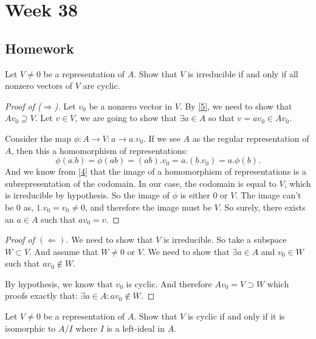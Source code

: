 \section{Week 38}



\subsection*{Homework}
\begin{thm}
Let \(V\neq 0\) be a representation of \(A\). Show that \(V\) is irreducible if and only if all nonzero vectors of \(V\) are cyclic.
\end{thm}

\begin{proof} [Proof of (\(\Longrightarrow\))]  Let \(v_{0}\) be a nonzero vector in \(V\). By \ref{5}, we need to show that \(Av_{0}\supseteq V\). Let \(v\in V\), we are going to show that \(\exists a\in A\) so that \(v=av_{0}\in Av_{0}\).

Consider the map \(\phi  : A \rightarrow V : a \rightarrow a.v_{0}\). If we see \(A\) as the regular representation of \(A\), then this a homomorphism of representations:
\[\phi (a.b)=\phi (ab)=(ab).v_{0}= a.(b.v_{0})=a.\phi (b).\]
And we know from \ref{4} that the image of a homomorphism of representations is a subrepresentation of the codomain. In our case, the codomain is equal to \(V\), which is irreducible by hypothesis. So the image of \(\phi \) is either \(0\) or \(V\). The image can't be $0$ as, \(1.v_{0}=v_{0}\neq 0\), and therefore the image must be \(V\). So surely, there exists an \(a\in A\) such that \(av_{0}=v\). \end{proof}

\begin{proof}[Proof of \((\Longleftarrow )\)] We need to show that \(V\) is irreducible. So take a subspace \(W\subset V\). And assume that \(W\neq 0\) or \(V\). We need to show that \(\exists a\in A\) and \(v_{0}\in W\) such that \(av_{0}\not\in W\).

By hypothesis, we know that \(v_{0}\) is cyclic. And therefore \(Av_{0}=V\supset W\) which proofs exactly that: \(\exists a\in A : av_{0}\not\in W.\)
\end{proof}

\begin{thm}
Let \(V\neq 0\) be a representation of \(A\). Show that \(V\) is cyclic if and only if it is isomorphic to \(A/I\) where \(I\) is a left-ideal in \(A\).
\end{thm}

